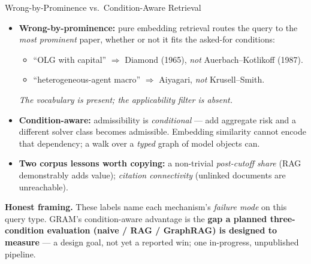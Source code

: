 \begin{frame}{Wrong-by-Prominence vs.\ Condition-Aware Retrieval}
\begin{itemize}
\item \textbf{Wrong-by-prominence:} pure embedding retrieval routes the query to the \emph{most prominent} paper, whether or not it fits the asked-for conditions:
\begin{itemize}\small
    \item ``OLG with capital'' $\Rightarrow$ Diamond (1965), \emph{not} Auerbach--Kotlikoff (1987).
    \item ``heterogeneous-agent macro'' $\Rightarrow$ Aiyagari, \emph{not} Krusell--Smith.
\end{itemize}
\emph{The vocabulary is present; the applicability filter is absent.}

\smallskip
\item \textbf{Condition-aware:} admissibility is \emph{conditional} --- add aggregate risk and a different solver class becomes admissible. Embedding similarity cannot encode that dependency; a walk over a \emph{typed} graph of model objects can.

\smallskip
\item \textbf{Two corpus lessons worth copying:} a non-trivial \emph{post-cutoff share} (RAG demonstrably adds value); \emph{citation connectivity} (unlinked documents are unreachable).
\end{itemize}

\smallskip
\begin{takeawaybox}
\textbf{Honest framing.} These labels name each mechanism's \emph{failure mode} on this query type. GRAM's condition-aware advantage is the \textbf{gap a planned three-condition evaluation (naive / RAG / GraphRAG) is designed to measure} --- a design goal, not yet a reported win; one in-progress, unpublished pipeline.
\end{takeawaybox}
\end{frame}

